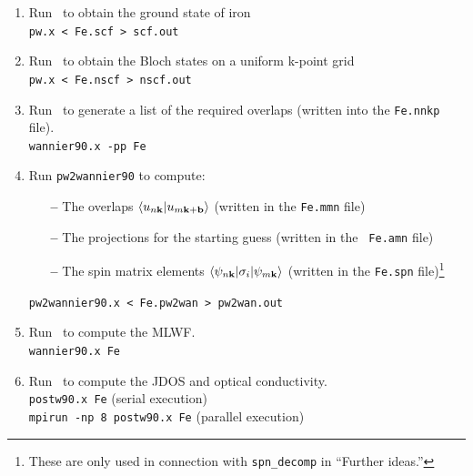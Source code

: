 \documentclass[a4paper,11pt,twoside]{article}
\begin{document}
\begin{enumerate}
\item Run \pwscf\ to obtain the ground state of iron\\
{\tt pw.x < Fe.scf > scf.out}

\item Run \pwscf\ to obtain the Bloch states on a uniform k-point
  grid\\ 
{\tt pw.x < Fe.nscf > nscf.out}

\item Run \wannier\ to generate a list of the required overlaps (written
  into the {\tt Fe.nnkp} file).\\
{\tt wannier90.x -pp Fe}

\item Run {\tt pw2wannier90} to compute:
  \begin{itemize}

  \item[{\bf --}] The overlaps $\langle u_{n{\bf k}}\vert u_{m{\bf k}+{\bf
          b}}\rangle$ (written in the {\tt Fe.mmn} file)

  \item[{\bf --}] The projections for the starting guess (written in the {\tt
        Fe.amn} file)

  \item[{\bf --}] The spin matrix elements $\langle \psi_{n{\bf
        k}}\vert \sigma_i\vert \psi_{m{\bf k}}\rangle$ (written in the
    {\tt Fe.spn} file)\footnote{These are only used in connection with
{\tt spn\_decomp} in ``Further ideas.''}

  \end{itemize}
{\tt pw2wannier90.x < Fe.pw2wan > pw2wan.out}

\item Run \wannier\ to compute the MLWF.\\
{\tt wannier90.x Fe}

\item Run \postw\ to compute the JDOS and optical conductivity.\\
  {\tt postw90.x Fe} (serial execution)\\
  {\tt mpirun -np 8 postw90.x Fe} (parallel execution)

\end{enumerate}
\end{document}
